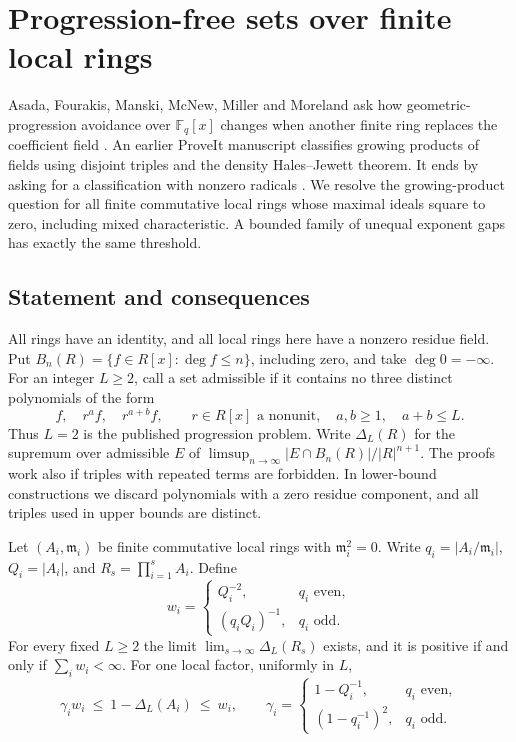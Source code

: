 \section{Progression-free sets over finite local rings}\label{sec:rings}

Asada, Fourakis, Manski, McNew, Miller and Moreland ask how geometric-progression avoidance over $\mathbb F_q[x]$ changes when another finite ring replaces the coefficient field \cite[Question 6.5]{asada}. An earlier ProveIt manuscript classifies growing products of fields using disjoint triples and the density Hales--Jewett theorem. It ends by asking for a classification with nonzero radicals \cite{products}. We resolve the growing-product question for all finite commutative local rings whose maximal ideals square to zero, including mixed characteristic. A bounded family of unequal exponent gaps has exactly the same threshold.

\subsection{Statement and consequences}
All rings have an identity, and all local rings here have a nonzero residue field. Put $B_n(R)=\{f\in R[x]:\deg f\le n\}$, including zero, and take $\deg 0=-\infty$. For an integer $L\ge2$, call a set admissible if it contains no three distinct polynomials of the form
\begin{equation}\label{eq:pattern}
              f,\quad r^a f,\quad r^{a+b}f,\qquad
 r\in R[x]\text{ a nonunit},\quad a,b\ge1,\quad a+b\le L .
\end{equation}
Thus $L=2$ is the published progression problem. Write $\Delta_L(R)$ for the supremum over admissible $E$ of $\limsup_{n\to\infty}|E\cap B_n(R)|/|R|^{n+1}$. The proofs work also if triples with repeated terms are forbidden. In lower-bound constructions we discard polynomials with a zero residue component, and all triples used in upper bounds are distinct.

\begin{theorem}\label{thm:local}
Let $(A_i,\mathfrak m_i)$ be finite commutative local rings with $\mathfrak m_i^2=0$. Write $q_i=|A_i/\mathfrak m_i|$, $Q_i=|A_i|$, and $R_s=\prod_{i=1}^s A_i$. Define
\[
 w_i=\begin{cases}
       Q_i^{-2},& q_i\text{ even},\\
       (q_iQ_i)^{-1},& q_i\text{ odd}.
     \end{cases}
\]
For every fixed $L\ge2$ the limit $\lim_{s\to\infty}\Delta_L(R_s)$ exists, and it is positive if and only if $\sum_i w_i<\infty$. For one local factor, uniformly in $L$,
\[
       \gamma_i w_i\ \le\ 1-\Delta_L(A_i)\ \le\ w_i,\qquad
 \gamma_i=\begin{cases}
    1-Q_i^{-1},&q_i\text{ even},\\
    (1-q_i^{-1})^2,&q_i\text{ odd}.
 \end{cases}
\]
\end{theorem}

